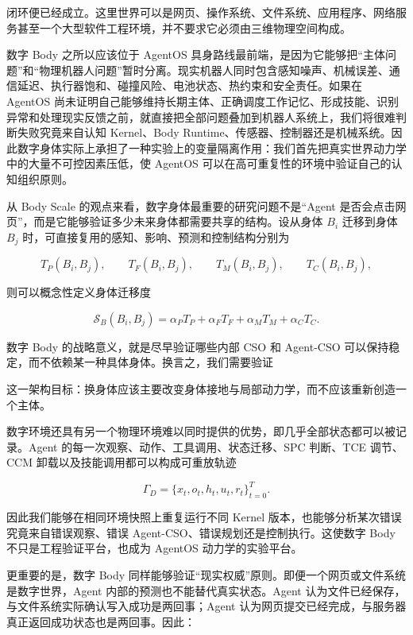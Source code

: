 闭环便已经成立。这里世界可以是网页、操作系统、文件系统、应用程序、网络服务甚至一个大型软件工程环境，并不要求它必须由三维物理空间构成。

数字 Body 之所以应该位于 AgentOS 具身路线最前端，是因为它能够把“主体问题”和“物理机器人问题”暂时分离。现实机器人同时包含感知噪声、机械误差、通信延迟、执行器饱和、碰撞风险、电池状态、热约束和安全责任。如果在 AgentOS 尚未证明自己能够维持长期主体、正确调度工作记忆、形成技能、识别异常和处理现实反馈之前，就直接把全部问题叠加到机器人系统上，我们将很难判断失败究竟来自认知 Kernel、Body Runtime、传感器、控制器还是机械系统。因此数字身体实际上承担了一种实验上的变量隔离作用：我们首先把真实世界动力学中的大量不可控因素压低，使 AgentOS 可以在高可重复性的环境中验证自己的认知组织原则。

从 Body Scale 的观点来看，数字身体最重要的研究问题不是“Agent 是否会点击网页”，而是它能够验证多少未来身体都需要共享的结构。设从身体 $B_i$ 迁移到身体 $B_j$ 时，可直接复用的感知、影响、预测和控制结构分别为

$$
T_P(B_i,B_j),\qquad
T_F(B_i,B_j),\qquad
T_M(B_i,B_j),\qquad
T_C(B_i,B_j),
$$

则可以概念性定义身体迁移度

$$
\mathcal S_B(B_i,B_j)
=
\alpha_P T_P+
\alpha_F T_F+
\alpha_M T_M+
\alpha_C T_C.
$$

数字 Body 的战略意义，就是尽早验证哪些内部 CSO 和 Agent-CSO 可以保持稳定，而不依赖某一种具体身体。换言之，我们需要验证

\begin{statementbox}
\centering
{}
\end{statementbox}

这一架构目标：换身体应该主要改变身体接地与局部动力学，而不应该重新创造一个主体。

数字环境还具有另一个物理环境难以同时提供的优势，即几乎全部状态都可以被记录。Agent 的每一次观察、动作、工具调用、状态迁移、SPC 判断、TCE 调节、CCM 卸载以及技能调用都可以构成可重放轨迹

$$
\Gamma_D=
\{x_t,o_t,h_t,u_t,r_t\}_{t=0}^{T}.
$$

因此我们能够在相同环境快照上重复运行不同 Kernel 版本，也能够分析某次错误究竟来自错误观察、错误 Agent-CSO、错误规划还是控制执行。这使数字 Body 不只是工程验证平台，也成为 AgentOS 动力学的实验平台。

更重要的是，数字 Body 同样能够验证“现实权威”原则。即便一个网页或文件系统是数字世界，Agent 内部的预测也不能替代真实状态。Agent 认为文件已经保存，与文件系统实际确认写入成功是两回事；Agent 认为网页提交已经完成，与服务器真正返回成功状态也是两回事。因此：

